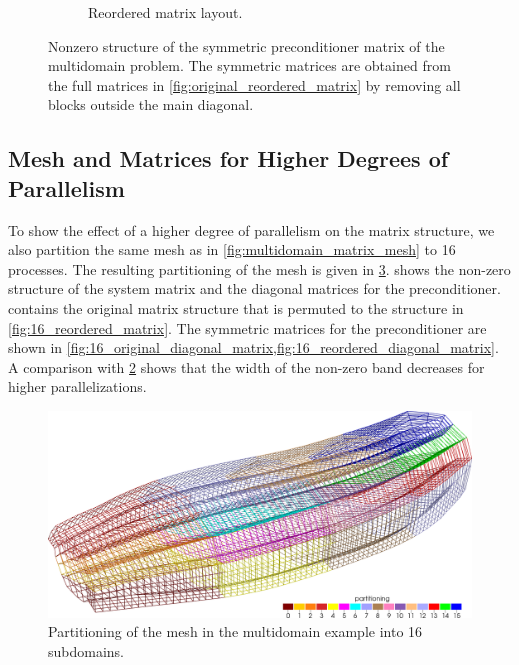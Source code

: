 \begin{figure}
\begin{subfigure}[t]{0.49\textwidth}
    \caption{Reordered matrix layout.}%
    \label{fig:reordered_diagonal_matrix}%
  \end{subfigure}
  \caption{Nonzero structure of the symmetric preconditioner matrix of the multidomain problem. The symmetric matrices are obtained from the full matrices in \cref{fig:original_reordered_matrix} by removing all blocks outside the main diagonal.}%
  \label{fig:original_reordered_diagonal_matrix}%
\end{figure}%

\subsection{Mesh and Matrices for Higher Degrees of Parallelism}
To show the effect of a higher degree of parallelism on the matrix structure, we also partition the same mesh as in \cref{fig:multidomain_matrix_mesh} to 16 processes. The resulting partitioning of the mesh is given in \cref{fig:16_multidomain_matrix_mesh}.
 shows the non-zero structure of the system matrix and the diagonal matrices for the preconditioner.  contains the original matrix structure that is permuted to the structure in \cref{fig:16_reordered_matrix}. 
The symmetric matrices for the preconditioner are shown in \cref{fig:16_original_diagonal_matrix,fig:16_reordered_diagonal_matrix}. 
A comparison with \cref{fig:original_reordered_diagonal_matrix} shows that the width of the non-zero band decreases for higher parallelizations.


\begin{figure}
  \centering%
  \includegraphics[width=\textwidth]{images/implementation/16_multidomain_matrix_mesh.png}%
  \caption{Partitioning of the mesh in the multidomain example into 16 subdomains.}%
  \label{fig:16_multidomain_matrix_mesh}%
\end{figure}%

